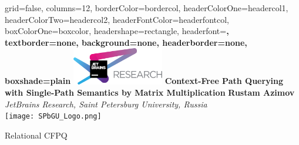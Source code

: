 \documentclass[a0paper,portrait]{baposter}
\begin{document}
\setlength{\fboxsep}{0pt}


\begin{poster}{
grid=false,
columns=12, %
borderColor=bordercol, %
headerColorOne=headercol1, %
headerColorTwo=headercol2, %
headerFontColor=headerfontcol, %
boxColorOne=boxcolor, %
headershape=rectangle, %
headerfont=\Large\sf\bf, %
textborder=none,
background=none,
headerborder=none, %
boxshade=plain
}
{\includegraphics[width=4cm]{jr.png}}
%
%
{\bf \huge{Context-Free Path Querying with Single-Path Semantics by Matrix Multiplication} }
{\vspace{0.6em} \smaller \textbf{Rustam Azimov} \\  %
\smaller \it {JetBrains Research, Saint Petersburg University, Russia } \\ %
}
{\texttt{[image: SPbGU\_Logo.png]}} %


\begin{posterbox}[name=CFPQ,column=0,row=0, span=4]{Relational CFPQ}


\end{posterbox}
\end{poster}
\end{document}
